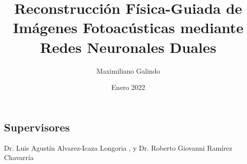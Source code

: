 \documentclass[12pt, a4paper]{report}
\begin{document}
\begin{titlepage}
    \centering  
    \title{Reconstrucción Física-Guiada de Imágenes Fotoacústicas mediante Redes Neuronales Duales} 
    \author{Maximiliano Galindo}
    \date{Enero 2022}
\end{titlepage}

\beginfrontmatter








\subsection*{Supervisores}
Dr. Luis Agustín Alvarez-Icaza Longoria , y Dr. Roberto Giovanni Ramírez Chavarría






\end{document}
